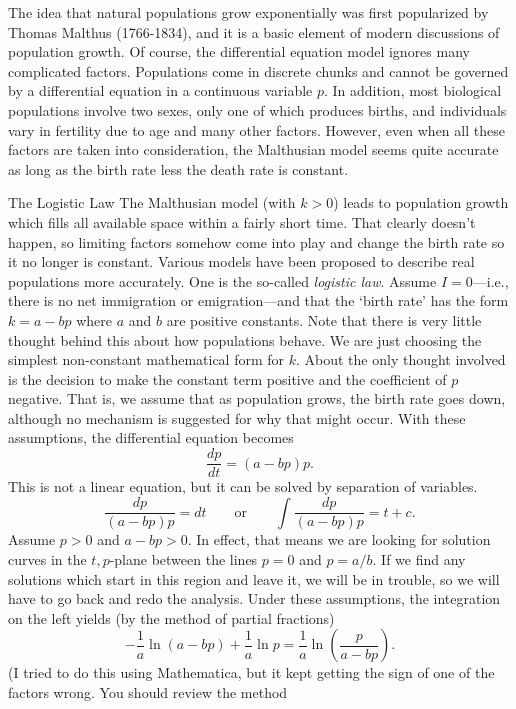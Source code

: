 The idea that natural populations grow exponentially was
first popularized by Thomas Malthus (1766-1834), and it
%
is a basic element of modern discussions of population
growth.  Of course, the differential equation model ignores
many complicated factors.  Populations come in discrete
chunks and cannot be governed by a differential equation
in a continuous variable $p$.  In addition, most biological
populations involve two sexes, only one of which produces
births, and individuals vary in fertility due to age
and many other factors.  However, even when all these
factors are taken into consideration, the Malthusian model
seems quite accurate as long as the birth rate less the
death rate is constant.

\subhead The Logistic Law \endsubhead
The Malthusian model (with $k > 0$)
 leads to population growth which fills
all available space within a fairly short time.  That clearly
doesn't happen, so limiting factors somehow come into play
and change the birth rate so it no longer is constant.
Various models have been proposed to describe real populations
more accurately.    One is the so-called {\it logistic law}.
Assume $I = 0$---i.e., there is
no net immigration or emigration---and that
the `birth rate' has the form $k = a - bp$ where $a$ and $b$
are positive constants.  Note that there is very little thought behind
this about how populations behave.  We are just choosing the
simplest non-constant mathematical form for $k$.  About the only
thought involved is the decision to make the constant term positive
and the coefficient of $p$ negative.  That is, we assume that
as population grows, the birth rate goes down, although no
mechanism is suggested for why that might occur.  With
these assumptions, the differential equation becomes
$$
  \frac{dp}{dt} = (a - bp)p.
$$
%
This is not a linear equation, but it can be solved by
separation of variables.
$$
  \frac{dp}{(a - bp)p} = dt \qquad\text{or}\qquad
\int\frac{dp}{(a - bp)p} = t + c.
$$
Assume $p > 0$ and  $a - bp > 0$.  In effect, that means we
are looking for solution curves in the $t,p$-plane between the
lines $p = 0$ and  $p = a/b$.  
If we find any solutions which start in this region and leave it,
we will be in trouble, so we will
have to go back and redo the analysis.
Under these assumptions, the integration on the left yields
(by the method of partial fractions) 
$$
-\frac 1a \ln(a - bp) + \frac 1a \ln p = \frac 1a\ln\left(\frac p{a - bp}
\right).
$$
(I tried to do this using Mathematica, but it kept getting the
sign of one of the factors wrong.  You should review the method
